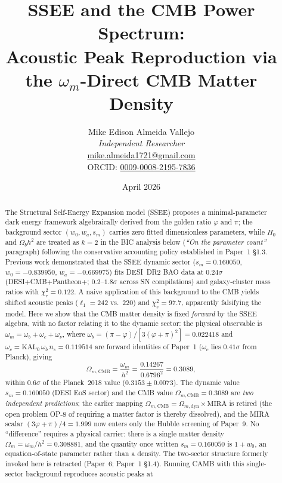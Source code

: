 \documentclass[12pt,a4paper]{article}
\title{\textbf{SSEE and the CMB Power Spectrum:\\
Acoustic Peak Reproduction via the $\omega_m$-Direct CMB Matter Density}}
\author{Mike Edison Almeida Vallejo \\
\small \textit{Independent Researcher} \\
\small \href{mailto:mike.almeida1721@gmail.com}{mike.almeida1721@gmail.com} \\
\small ORCID: \href{https://orcid.org/0009-0008-2195-7836}{0009-0008-2195-7836}
}
\date{April 2026}
\begin{document}
\maketitle

\begin{abstract}
The Structural Self-Energy Expansion model (SSEE) proposes a minimal-parameter
dark energy framework algebraically derived from the golden ratio $\varphi$ and $\pi$;
the background sector $(w_0, w_a, s_m)$ carries zero fitted
dimensionless parameters, while $H_0$ and $\Omega_b h^2$ are treated as $k=2$ in
the BIC analysis below (\textit{``On the parameter count''} paragraph) following the
conservative accounting policy established in Paper~1 \S1.3.
Previous work demonstrated that the SSEE dynamic sector
($s_m=0.160050$, $w_0=-0.839950$, $w_a=-0.669975$) fits DESI~DR2 BAO data
at $0.24\sigma$ (DESI+CMB+Pantheon+; $0.2$--$1.8\sigma$ across SN compilations) \citep{DESI_DR2} and galaxy-cluster mass ratios with $\chi^2_r=0.122$.
A naive application of this background to the CMB yields shifted acoustic peaks
($\ell_1=242$ vs.\ $220$) and $\chi^2_r=97.7$, apparently falsifying the model.
Here we show that the CMB matter density is fixed \emph{forward} by the SSEE
algebra, with no factor relating it to the dynamic sector: the physical observable
is $\omega_m=\omega_b+\omega_c+\omega_\nu$, where $\omega_b=(\pi-\varphi)/[3(\varphi+\pi)^2]=0.022418$
and $\omega_c=\mathrm{KAL}_0\,\omega_b\,n_s=0.119514$ are forward identities of Paper~1
($\omega_c$ lies $0.41\sigma$ from Planck), giving
\begin{equation*}
  \Omega_{m,\mathrm{CMB}}
  = \frac{\omega_m}{h^2}
  = \frac{0.14267}{0.6796^2} = 0.3089,
\end{equation*}
within $0.6\sigma$ of the Planck~2018 value ($0.3153\pm0.0073$). The dynamic value
$s_m=0.160050$ (DESI EoS sector) and the CMB value $\Omega_{m,\mathrm{CMB}}=0.3089$
are \emph{two independent predictions}; the earlier mapping
$\Omega_{m,\mathrm{CMB}}=\Omega_{m,\mathrm{dyn}}\times\mathrm{MIRA}$ is retired (the open
problem OP-8 of requiring a matter factor is thereby dissolved), and the MIRA scalar
$(3\varphi+\pi)/4=1.999$ now enters only the Hubble screening of Paper~9.
No ``difference'' requires a physical carrier: there is a single matter
density $\Omega_m=\omega_m/h^2=0.308881$, and the quantity once written
$s_m=0.160050$ is $1+w_0$, an equation-of-state parameter rather
than a density. The two-sector structure formerly invoked here is retracted
(Paper~6; Paper~1 \S1.4).
Running CAMB with this single-sector background reproduces acoustic peaks at

\end{abstract}
\end{document}
